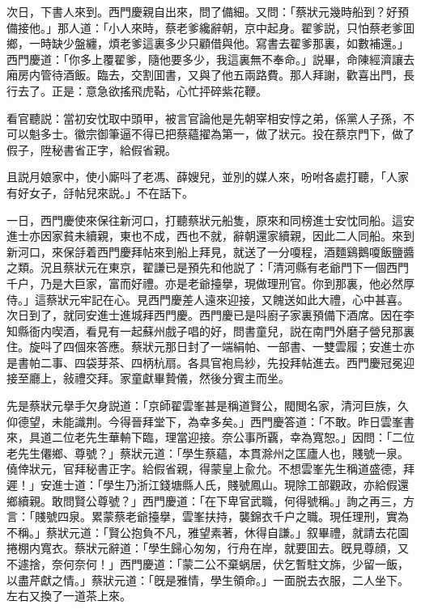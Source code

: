 次日，下書人來到。西門慶親自出來，問了備細。又問：「蔡狀元幾時船到？好預備接他。」那人道：「小人來時，蔡老爹纔辭朝，京中起身。翟爹説，只怕蔡老爹囬鄉，一時缺少盤纏，煩老爹這裏多少只顧借與他。寫書去翟爹那裏，如數補還。」西門慶道：「你多上覆翟爹，隨他要多少，我這裏無不奉命。」説畢，命陳經濟讓去廂房内管待酒飯。臨去，交割囬書，又與了他五兩路費。那人拜謝，歡喜出門，長行去了。正是：意急欲搖飛虎䩞，心忙抨碎紫花鞭。

看官聽説：當初安忱取中頭甲，被言官論他是先朝宰相安惇之弟，係黨人子孫，不可以魁多士。徽宗御筆逼不得已把蔡蘊擢為第一，做了狀元。投在蔡京門下，做了假子，陞秘書省正字，給假省親。

且説月娘家中，使小廝呌了老馮、薛嫂兒，並別的媒人來，吩咐各處打聽，「人家有好女子，㧱帖兒來説。」不在話下。

一日，西門慶使來保往新河口，打聽蔡狀元船隻，原來和同榜進士安忱同船。這安進士亦因家貧未續親，東也不成，西也不就，辭朝還家續親，因此二人同船。來到新河口，來保㧱着西門慶拜帖來到船上拜見，就送了一分嗄程，酒麵鷄鵝嗄飯鹽醬之類。況且蔡狀元在東京，翟謙已是預先和他説了：「清河縣有老爺門下一個西門千户，乃是大巨家，富而好禮。亦是老爺擡擧，現做理刑官。你到那裏，他必然厚侍。」這蔡狀元牢記在心。見西門慶差人遠來迎接，又餽送如此大禮，心中甚喜。次日到了，就同安進士進城拜西門慶。西門慶已是呌廚子家裏預備下酒席。因在李知縣衙内喫酒，看見有一起蘇州戲子唱的好，問書童兒，説在南門外磨子營兒那裏住。旋呌了四個來答應。蔡狀元那日封了一端絹帕、一部書、一雙雲履；安進士亦是書帕二事、四袋芽茶、四柄杭扇。各具官袍烏紗，先投拜帖進去。西門慶冠冕迎接至廳上，敍禮交拜。家童獻畢贄儀，然後分賓主而坐。

先是蔡狀元擧手欠身説道：「京師翟雲峯甚是稱道賢公，閥閲名家，清河巨族，久仰德望，未能識荆。今得晉拜堂下，為幸多矣。」西門慶答道：「不敢。昨日雲峯書來，具道二位老先生華輈下臨，理當迎接。奈公事所覊，幸為寬恕。」因問：「二位老先生僊鄉、尊號？」蔡狀元道：「學生蔡蘊，本貫滁州之匡廬人也，賤號一泉。僥倖狀元，官拜秘書正字。給假省親，得蒙皇上兪允。不想雲峯先生稱道盛德，拜遲！」安進士道：「學生乃浙江錢塘縣人氏，賤號鳳山。現除工部觀政，亦給假還鄉續親。敢問賢公尊號？」西門慶道：「在下卑官武職，何得號稱。」詢之再三，方言：「賤號四泉。累蒙蔡老爺擡擧，雲峯扶持，襲錦衣千户之職。現任理刑，實為不稱。」蔡狀元道：「賢公抱負不凡，雅望素著，休得自謙。」叙畢禮，就請去花園捲棚内寬衣。蔡狀元辭道：「學生歸心匆匆，行舟在岸，就要囬去。旣見尊顔，又不遽捨，奈何奈何！」西門慶道：「蒙二公不棄蜗居，伏乞暫駐文旆，少留一飯，以盡芹獻之情。」蔡狀元道：「旣是雅情，學生領命。」一面脱去衣服，二人坐下。左右又換了一道茶上來。

